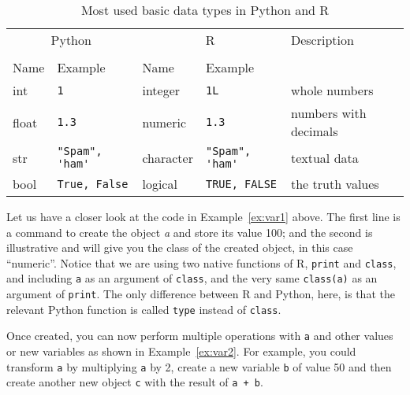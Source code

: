 
\begin{table}
  \caption{\label{tab:types}Most used basic data types in Python and R}{
  \begin{tabularx}{\textwidth}{lllll}
    \toprule
    \multicolumn{2}{c}{Python} & \multicolumn{2}{c}{R}& Description \\
    \cmidrule(lr){1-2}    \cmidrule(lr){3-4}\\
    Name & Example & Name & Example \\
    \midrule
    int   & \verb+1+             & integer   & \verb+1L+             & whole numbers \\
    float & \verb+1.3+           & numeric   & \verb+1.3+           & numbers with decimals \\
    str   & \verb+"Spam", 'ham'+ & character & \verb+"Spam", 'ham'+ & textual data  \\
    bool  & \verb+True, False+   & logical   & \verb+TRUE, FALSE+   & the truth values \\
    \bottomrule
  \end{tabularx}}{}
\end{table}
    


Let us have a closer look at the code in Example~\ref{ex:var1} above.
The first line is a command to create the object \emph{a} and store
its value 100; and the second is illustrative and will give you the
class of the created object, in this case ``numeric''. Notice that we
are using two native functions of R, \texttt{print} and \texttt{class}, and
including \verb|a| as an argument of \texttt{class}, and the very same
\texttt{class(a)} as an argument of \texttt{print}. The only difference
between R and Python, here, is that the relevant Python function is
called \texttt{type} instead of \texttt{class}.


Once created, you can now perform multiple operations
with \verb|a| and other values or new variables as shown in Example~\ref{ex:var2}. For example, you
could transform \verb|a| by multiplying \verb|a| by 2, create a new
variable \verb|b| of value 50 and then create another new object
\verb|c| with the result of \verb|a + b|.

